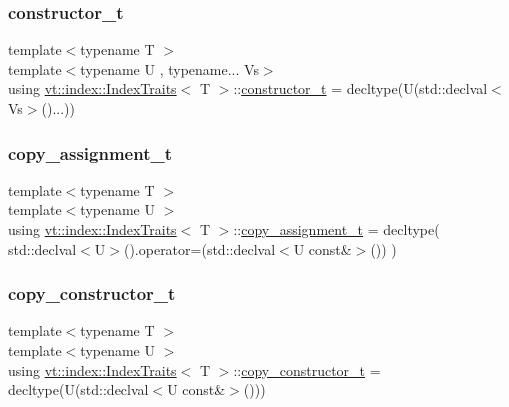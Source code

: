 \subsubsection{\texorpdfstring{constructor\+\_\+t}{constructor\_t}}
{\footnotesize\ttfamily template$<$typename T $>$ \\
template$<$typename U , typename... Vs$>$ \\
using \hyperlink{structvt_1_1index_1_1_index_traits}{vt\+::index\+::\+Index\+Traits}$<$ T $>$\+::\hyperlink{structvt_1_1index_1_1_index_traits_a752bed91b021dff94a5b2863442e07c9}{constructor\+\_\+t} =  decltype(U(std\+::declval$<$Vs$>$()...))}

\mbox{\label{structvt_1_1index_1_1_index_traits_ad8fed19c85f6bf6fb280a492c4bf04c5}} 
\subsubsection{\texorpdfstring{copy\+\_\+assignment\+\_\+t}{copy\_assignment\_t}}
{\footnotesize\ttfamily template$<$typename T $>$ \\
template$<$typename U $>$ \\
using \hyperlink{structvt_1_1index_1_1_index_traits}{vt\+::index\+::\+Index\+Traits}$<$ T $>$\+::\hyperlink{structvt_1_1index_1_1_index_traits_ad8fed19c85f6bf6fb280a492c4bf04c5}{copy\+\_\+assignment\+\_\+t} =  decltype( std\+::declval$<$U$>$().operator=(std\+::declval$<$U const\&$>$()) )}

\mbox{\label{structvt_1_1index_1_1_index_traits_ad99299628a662db3cfa5021b810e8846}} 
\subsubsection{\texorpdfstring{copy\+\_\+constructor\+\_\+t}{copy\_constructor\_t}}
{\footnotesize\ttfamily template$<$typename T $>$ \\
template$<$typename U $>$ \\
using \hyperlink{structvt_1_1index_1_1_index_traits}{vt\+::index\+::\+Index\+Traits}$<$ T $>$\+::\hyperlink{structvt_1_1index_1_1_index_traits_ad99299628a662db3cfa5021b810e8846}{copy\+\_\+constructor\+\_\+t} =  decltype(U(std\+::declval$<$U const\&$>$()))}

